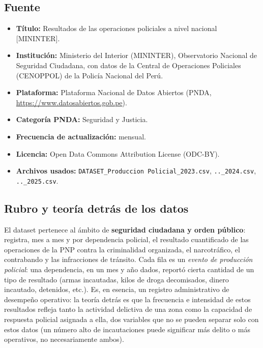 \documentclass[10pt,a4paper]{article}
\theoremstyle{definition}
\begin{document}
\subsection{Fuente}
\begin{itemize}
  \item \textbf{T\'itulo:} Resultados de las operaciones policiales a nivel nacional [MININTER].
  \item \textbf{Instituci\'on:} Ministerio del Interior (MININTER), Observatorio Nacional de Seguridad
    Ciudadana, con datos de la Central de Operaciones Policiales (CENOPPOL) de la Polic\'ia Nacional del
    Per\'u.
  \item \textbf{Plataforma:} Plataforma Nacional de Datos Abiertos (PNDA, \url{https://www.datosabiertos.gob.pe}).
  \item \textbf{Categor\'ia PNDA:} Seguridad y Justicia.
  \item \textbf{Frecuencia de actualizaci\'on:} mensual.
  \item \textbf{Licencia:} Open Data Commons Attribution License (ODC-BY).
  \item \textbf{Archivos usados:} \texttt{DATASET\_Produccion Policial\_2023.csv},
    \texttt{..\_2024.csv}, \texttt{..\_2025.csv}.
\end{itemize}

\subsection{Rubro y teor\'ia detr\'as de los datos}
El dataset pertenece al \'ambito de \textbf{seguridad ciudadana y orden p\'ublico}: registra, mes a mes
y por dependencia policial, el resultado cuantificado de las operaciones de la PNP contra la
criminalidad organizada, el narcotr\'afico, el contrabando y las infracciones de tr\'ansito. Cada fila
es un \emph{evento de producci\'on policial}: una dependencia, en un mes y a\~no dados, report\'o cierta
cantidad de un tipo de resultado (armas incautadas, kilos de droga decomisados, dinero incautado,
detenidos, etc.). Es, en esencia, un registro administrativo de desempe\~no operativo: la teor\'ia detr\'as
es que la frecuencia e intensidad de estos resultados refleja tanto la actividad delictiva de una zona
como la capacidad de respuesta policial asignada a ella, dos variables que no se pueden separar solo con
estos datos (un n\'umero alto de incautaciones puede significar m\'as delito o m\'as operativos, no
necesariamente ambos).
\end{document}
